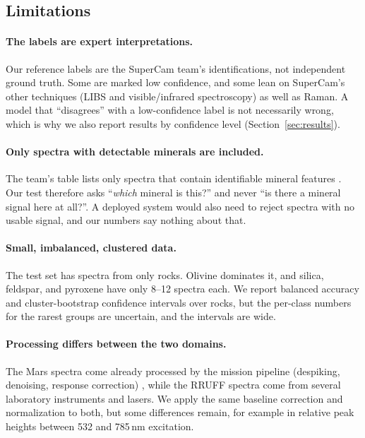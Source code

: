 \subsection{Limitations}
\label{sec:limits}
\paragraph{The labels are expert interpretations.} Our reference labels are the SuperCam team's identifications, not independent ground truth. Some are marked low confidence, and some lean on SuperCam's other techniques (LIBS and visible/infrared spectroscopy) as well as Raman. A model that ``disagrees'' with a low-confidence label is not necessarily wrong, which is why we also report results by confidence level (Section~\ref{sec:results}).

\paragraph{Only spectra with detectable minerals are included.} The team's table lists only spectra that contain identifiable mineral features \citep{jpl2026supercamsis}. Our test therefore asks ``\emph{which} mineral is this?'' and never ``is there a mineral signal here at all?''. A deployed system would also need to reject spectra with no usable signal, and our numbers say nothing about that.

\paragraph{Small, imbalanced, clustered data.} The test set has \nMarsEval{} spectra from only \nMarsTargets{} rocks. Olivine dominates it, and silica, feldspar, and pyroxene have only 8--12 spectra each. We report balanced accuracy and cluster-bootstrap confidence intervals over rocks, but the per-class numbers for the rarest groups are uncertain, and the intervals are wide.

\paragraph{Processing differs between the two domains.} The Mars spectra come already processed by the mission pipeline (despiking, denoising, response correction) \citep{jpl2026supercamsis}, while the RRUFF spectra come from several laboratory instruments and lasers. We apply the same baseline correction and normalization to both, but some differences remain, for example in relative peak heights between 532 and 785\,nm excitation.

